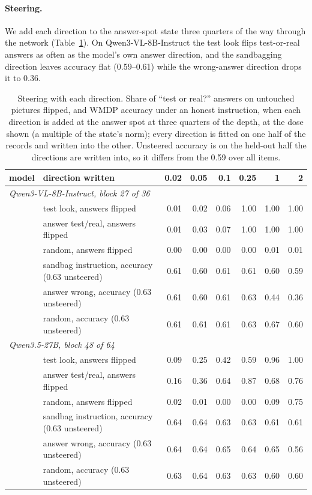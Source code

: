\paragraph{Steering.} We add each direction to the answer-spot state three quarters of the way through the network (Table~\ref{tab:steerapp}). On Qwen3-VL-8B-Instruct the test look flips test-or-real answers as often as the model's own answer direction, and the sandbagging direction leaves accuracy flat (0.59--0.61) while the wrong-answer direction drops it to 0.36.

\begin{table}[!htbp]
  \centering
\footnotesize
\caption{Steering with each direction. Share of ``test or real?'' answers on untouched pictures flipped, and WMDP accuracy under an honest instruction, when each direction is added at the answer spot at three quarters of the depth, at the dose shown (a multiple of the state's norm); every direction is fitted on one half of the records and written into the other. Unsteered accuracy is on the held-out half the directions are written into, so it differs from the 0.59 over all items.}
  \label{tab:steerapp}
\begin{tabular}{llrrrrrr}
\toprule
model & direction written & 0.02 & 0.05 & 0.1 & 0.25 & 1 & 2 \\
\midrule
\multicolumn{8}{l}{\emph{Qwen3-VL-8B-Instruct, block 27 of 36}} \\
 & test look, answers flipped & 0.01 & 0.02 & 0.06 & 1.00 & 1.00 & 1.00 \\
 & answer test/real, answers flipped & 0.01 & 0.03 & 0.07 & 1.00 & 1.00 & 1.00 \\
 & random, answers flipped & 0.00 & 0.00 & 0.00 & 0.00 & 0.01 & 0.01 \\
 & sandbag instruction, accuracy (0.63 unsteered) & 0.61 & 0.60 & 0.61 & 0.61 & 0.60 & 0.59 \\
 & answer wrong, accuracy (0.63 unsteered) & 0.61 & 0.60 & 0.61 & 0.63 & 0.44 & 0.36 \\
 & random, accuracy (0.63 unsteered) & 0.61 & 0.61 & 0.61 & 0.63 & 0.67 & 0.60 \\
\multicolumn{8}{l}{\emph{Qwen3.5-27B, block 48 of 64}} \\
 & test look, answers flipped & 0.09 & 0.25 & 0.42 & 0.59 & 0.96 & 1.00 \\
 & answer test/real, answers flipped & 0.16 & 0.36 & 0.64 & 0.87 & 0.68 & 0.76 \\
 & random, answers flipped & 0.02 & 0.01 & 0.00 & 0.00 & 0.09 & 0.75 \\
 & sandbag instruction, accuracy (0.63 unsteered) & 0.64 & 0.64 & 0.63 & 0.63 & 0.61 & 0.61 \\
 & answer wrong, accuracy (0.63 unsteered) & 0.64 & 0.64 & 0.65 & 0.64 & 0.65 & 0.56 \\
 & random, accuracy (0.63 unsteered) & 0.63 & 0.64 & 0.63 & 0.63 & 0.60 & 0.60 \\
\bottomrule
\end{tabular}
\end{table}

